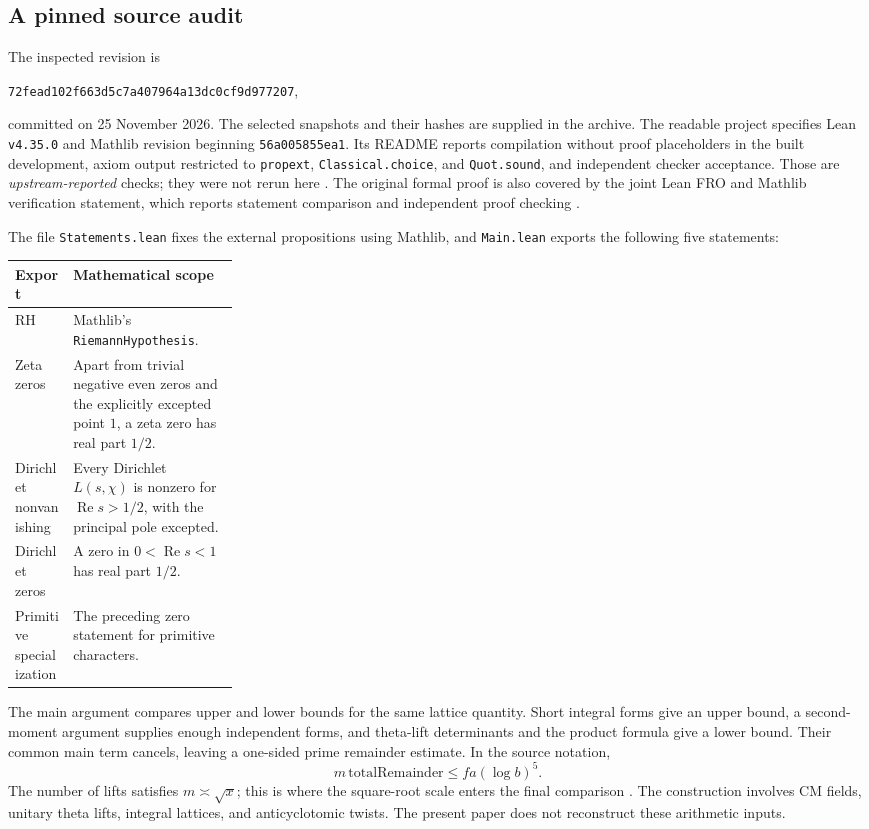\documentclass[11pt,a4paper]{article}
\theoremstyle{definition}
\theoremstyle{remark}
\numberwithin{equation}{section}
\newcommand{\Rea}{\operatorname{Re}}
\begin{document}
\subsection{A pinned source audit}

The inspected revision is
\begin{center}
\texttt{72fead102f663d5c7a407964a13dc0cf9d977207},
\end{center}
committed on 25 November 2026. The selected snapshots and their hashes
are supplied in the archive. The readable project specifies Lean
\texttt{v4.35.0} and Mathlib revision beginning \texttt{56a005855ea1}.
Its README reports compilation without proof placeholders in the built
development, axiom output restricted to \texttt{propext},
\texttt{Classical.choice}, and \texttt{Quot.sound}, and independent
checker acceptance. Those are \emph{upstream-reported} checks; they
were not rerun here \cite{repo,readable}.
The original formal proof is also covered by the joint Lean FRO and
Mathlib verification statement, which reports statement comparison
and independent proof checking \cite{leanverification}.

The file \texttt{Statements.lean} fixes the external propositions using
Mathlib, and \texttt{Main.lean} exports the following five statements:
\begin{center}
\begin{tabularx}{\linewidth}{@{}p{0.26\linewidth}X@{}}
\toprule
Export & Mathematical scope\\
\midrule
RH & Mathlib's \texttt{RiemannHypothesis}.\\
Zeta zeros & Apart from trivial negative even zeros and the explicitly
excepted point \(1\), a zeta zero has real part \(1/2\).\\
Dirichlet nonvanishing & Every Dirichlet \(L(s,\chi)\) is nonzero for
\(\Rea s>1/2\), with the principal pole excepted.\\
Dirichlet zeros & A zero in \(0<\Rea s<1\) has real part \(1/2\).\\
Primitive specialization & The preceding zero statement for primitive
characters.\\
\bottomrule
\end{tabularx}
\end{center}

The main argument compares upper and lower bounds for the same
lattice quantity. Short integral forms give an upper bound, a
second-moment argument supplies enough independent forms, and
theta-lift determinants and the product formula give a lower bound.
Their common main term cancels, leaving a one-sided prime remainder
estimate. In the source notation,
\[
 m\,\mathrm{totalRemainder}\leq f a(\log b)^5.
\]
The number of lifts satisfies \(m\asymp\sqrt{x}\); this is where the
square-root scale enters the final comparison \cite{guide,comparison}.
The construction involves CM fields, unitary theta lifts, integral
lattices, and anticyclotomic twists. The present paper does not
reconstruct these arithmetic inputs.
\end{document}
